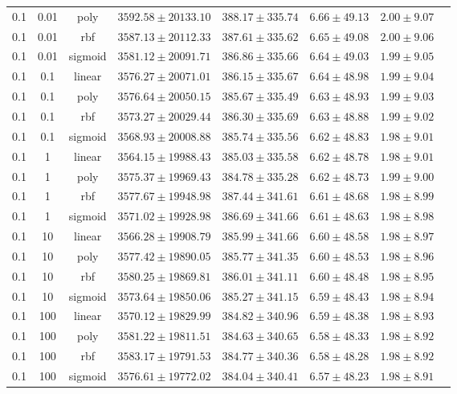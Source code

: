 \begin{tabular}{cccrrrrr}
0.1 & 0.01 & poly & $3592.58 \pm 20133.10$ & $388.17 \pm 335.74$ & $6.66 \pm 49.13$ & $2.00 \pm 9.07$\\
0.1 & 0.01 & rbf & $3587.13 \pm 20112.33$ & $387.61 \pm 335.62$ & $6.65 \pm 49.08$ & $2.00 \pm 9.06$\\
0.1 & 0.01 & sigmoid & $3581.12 \pm 20091.71$ & $386.86 \pm 335.66$ & $6.64 \pm 49.03$ & $1.99 \pm 9.05$\\
0.1 & 0.1 & linear & $3576.27 \pm 20071.01$ & $386.15 \pm 335.67$ & $6.64 \pm 48.98$ & $1.99 \pm 9.04$\\
0.1 & 0.1 & poly & $3576.64 \pm 20050.15$ & $385.67 \pm 335.49$ & $6.63 \pm 48.93$ & $1.99 \pm 9.03$\\
0.1 & 0.1 & rbf & $3573.27 \pm 20029.44$ & $386.30 \pm 335.69$ & $6.63 \pm 48.88$ & $1.99 \pm 9.02$\\
0.1 & 0.1 & sigmoid & $3568.93 \pm 20008.88$ & $385.74 \pm 335.56$ & $6.62 \pm 48.83$ & $1.98 \pm 9.01$\\
0.1 & 1 & linear & $3564.15 \pm 19988.43$ & $385.03 \pm 335.58$ & $6.62 \pm 48.78$ & $1.98 \pm 9.01$\\
0.1 & 1 & poly & $3575.37 \pm 19969.43$ & $384.78 \pm 335.28$ & $6.62 \pm 48.73$ & $1.99 \pm 9.00$\\
0.1 & 1 & rbf & $3577.67 \pm 19948.98$ & $387.44 \pm 341.61$ & $6.61 \pm 48.68$ & $1.98 \pm 8.99$\\
0.1 & 1 & sigmoid & $3571.02 \pm 19928.98$ & $386.69 \pm 341.66$ & $6.61 \pm 48.63$ & $1.98 \pm 8.98$\\
0.1 & 10 & linear & $3566.28 \pm 19908.79$ & $385.99 \pm 341.66$ & $6.60 \pm 48.58$ & $1.98 \pm 8.97$\\
0.1 & 10 & poly & $3577.42 \pm 19890.05$ & $385.77 \pm 341.35$ & $6.60 \pm 48.53$ & $1.98 \pm 8.96$\\
0.1 & 10 & rbf & $3580.25 \pm 19869.81$ & $386.01 \pm 341.11$ & $6.60 \pm 48.48$ & $1.98 \pm 8.95$\\
0.1 & 10 & sigmoid & $3573.64 \pm 19850.06$ & $385.27 \pm 341.15$ & $6.59 \pm 48.43$ & $1.98 \pm 8.94$\\
0.1 & 100 & linear & $3570.12 \pm 19829.99$ & $384.82 \pm 340.96$ & $6.59 \pm 48.38$ & $1.98 \pm 8.93$\\
0.1 & 100 & poly & $3581.22 \pm 19811.51$ & $384.63 \pm 340.65$ & $6.58 \pm 48.33$ & $1.98 \pm 8.92$\\
0.1 & 100 & rbf & $3583.17 \pm 19791.53$ & $384.77 \pm 340.36$ & $6.58 \pm 48.28$ & $1.98 \pm 8.92$\\
0.1 & 100 & sigmoid & $3576.61 \pm 19772.02$ & $384.04 \pm 340.41$ & $6.57 \pm 48.23$ & $1.98 \pm 8.91$\\

\end{tabular}

